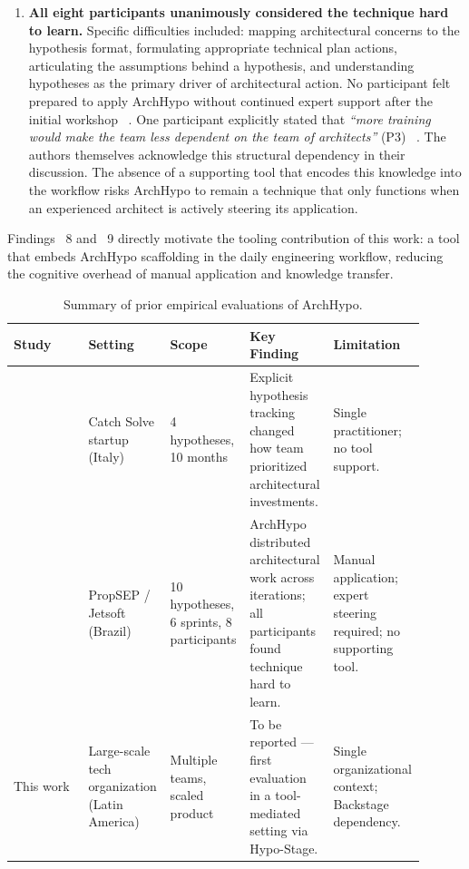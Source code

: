 \begin{enumerate}
  \item \textbf{All eight participants unanimously considered the technique hard to
  learn.} Specific difficulties included: mapping architectural concerns to the hypothesis
  format, formulating appropriate technical plan actions, articulating the assumptions
  behind a hypothesis, and understanding hypotheses as the primary driver of
  architectural action. No participant felt prepared to apply ArchHypo without
  continued expert support after the initial workshop ~\citep{silva2024tse}. 
  One participant explicitly stated that \emph{``more training would make the team less dependent on the team of architects''} (P3) ~\citep{silva2024tse}. 
  The authors themselves acknowledge this structural dependency in their discussion. 
  The absence of a supporting tool that encodes this knowledge into the workflow risks ArchHypo to remain a technique that only functions when an experienced architect is actively steering its application.
\end{enumerate}

Findings ~8 and ~9 directly motivate the tooling contribution of this work: a tool that
embeds ArchHypo scaffolding in the daily engineering workflow, reducing the cognitive
overhead of manual application and knowledge transfer.

\begin{table}[htbp]
\centering
\caption{Summary of prior empirical evaluations of ArchHypo.}
\label{tab:archhypo-evaluations}
\begin{tabular}{p{0.18\linewidth} p{0.18\linewidth} p{0.18\linewidth} p{0.18\linewidth} p{0.18\linewidth}}
\toprule
\textbf{Study} & \textbf{Setting} & \textbf{Scope} & \textbf{Key Finding} & \textbf{Limitation} \\
\midrule
\citep{silva2024ieeesw} & Catch Solve startup (Italy) & 4 hypotheses, 10 months & Explicit hypothesis tracking changed how team prioritized architectural investments. & Single practitioner; no tool support. \\
\midrule
\citep{silva2024tse} & PropSEP / Jetsoft (Brazil) & 10 hypotheses, 6 sprints, 8 participants & ArchHypo distributed architectural work across iterations; all participants found technique hard to learn. & Manual application; expert steering required; no supporting tool. \\
\midrule
This work & Large-scale tech organization (Latin America) & Multiple teams, scaled product & To be reported --- first evaluation in a tool-mediated setting via Hypo-Stage. & Single organizational context; Backstage dependency. \\
\bottomrule
\end{tabular}
\end{table}

